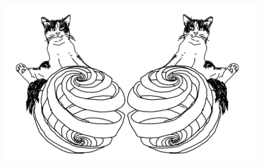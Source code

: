 \documentclass[10pt, a4paper, singlespacing, headsepline]{report}
\begin{document}
\begin{center}
\includegraphics[scale=0.2]{bepqed.pdf}
\vspace{10cm}
\end{center}








\end{document}
